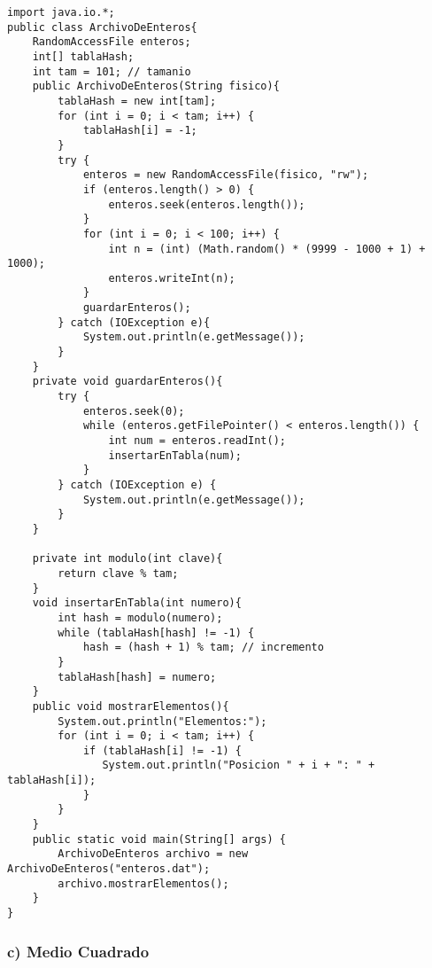 \documentclass{scrreprt}
\begin{document}
\begin{lstlisting}[style=java]
import java.io.*;
public class ArchivoDeEnteros{
    RandomAccessFile enteros;
    int[] tablaHash;
    int tam = 101; // tamanio
    public ArchivoDeEnteros(String fisico){
        tablaHash = new int[tam];
        for (int i = 0; i < tam; i++) {
            tablaHash[i] = -1;
        }
        try {
            enteros = new RandomAccessFile(fisico, "rw");
            if (enteros.length() > 0) {
                enteros.seek(enteros.length());
            }
            for (int i = 0; i < 100; i++) {
                int n = (int) (Math.random() * (9999 - 1000 + 1) + 1000);
                enteros.writeInt(n);
            }
            guardarEnteros();
        } catch (IOException e){
            System.out.println(e.getMessage());
        }
    }
    private void guardarEnteros(){
        try {
            enteros.seek(0);
            while (enteros.getFilePointer() < enteros.length()) {
                int num = enteros.readInt();
                insertarEnTabla(num);
            }
        } catch (IOException e) {
            System.out.println(e.getMessage());
        }
    }

    private int modulo(int clave){
        return clave % tam;
    }
    void insertarEnTabla(int numero){
        int hash = modulo(numero);
        while (tablaHash[hash] != -1) {
            hash = (hash + 1) % tam; // incremento
        }
        tablaHash[hash] = numero;
    }
    public void mostrarElementos(){
        System.out.println("Elementos:");
        for (int i = 0; i < tam; i++) {
            if (tablaHash[i] != -1) {
               System.out.println("Posicion " + i + ": " + tablaHash[i]);
            }
        }
    }
    public static void main(String[] args) {
        ArchivoDeEnteros archivo = new ArchivoDeEnteros("enteros.dat");
        archivo.mostrarElementos();
    }
}
\end{lstlisting}

\subsubsection{c) Medio Cuadrado}
\end{document}
